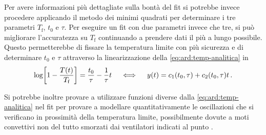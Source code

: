         Per avere informazioni più dettagliate sulla bontà del fit si potrebbe invece procedere applicando il metodo dei minimi quadrati per determinare i tre parametri $T_\text{f}$, $t_0$ e $\tau$. Per eseguire un fit con due parametri invece che tre, si può migliorare l'accuratezza su $T_\text{f}$ continuando a prendere dati il più a lungo possibile. Questo permetterebbe di fissare la temperatura limite con più sicurezza e di determinare $t_0$ e $\tau$ attraverso la linearizzazione della \eqref{eq:ard:temp-analitica} in
        \begin{equation*}
            \log\!\bqty{1-\frac{T\pqty{t}}{T_\text{f}}} = \frac{t_0}{\tau} - \frac{1}{\tau}t 
            \quad\iff\quad 
            y\pqty{t} = c_1\pqty{t_0,\tau} + c_2\pqty{t_0,\tau}t
            \myperiod
        \end{equation*}

        Si potrebbe inoltre provare a utilizzare funzioni diverse dalla \eqref{eq:ard:temp-analitica} nel fit per provare a modellare quantitativamente le oscillazioni che si verificano in prossimità della temperatura limite, possibilmente dovute a moti convettivi non del tutto smorzati dai ventilatori indicati al punto .
        
